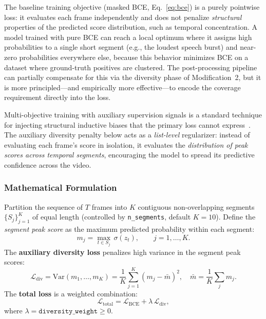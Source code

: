 \documentclass[10pt,conference]{IEEEtran}
\begin{document}
The baseline training objective (masked BCE, Eq.~\ref{eq:bce}) is a purely
pointwise loss: it evaluates each frame independently and does not penalize
\emph{structural} properties of the predicted score distribution, such as
temporal concentration. A model trained with pure BCE can reach a local
optimum where it assigns high probabilities to a single short segment (e.g.,
the loudest speech burst) and near-zero probabilities everywhere else, because
this behavior minimizes BCE on a dataset where ground-truth positives are
clustered. The post-processing pipeline can partially compensate for this via
the diversity phase of Modification~2, but it is more principled---and
empirically more effective---to encode the coverage requirement directly into
the loss.

Multi-objective training with auxiliary supervision signals is a standard
technique for injecting structural inductive biases that the primary loss
cannot express~\cite{caruana1997multitask}. The auxiliary diversity penalty
below acts as a \emph{list-level} regularizer: instead of evaluating each
frame's score in isolation, it evaluates the \emph{distribution of peak scores
across temporal segments}, encouraging the model to spread its predictive
confidence across the video.

\subsubsection{Mathematical Formulation}

Partition the sequence of $T$ frames into $K$ contiguous non-overlapping
segments $\{S_j\}_{j=1}^{K}$ of equal length (controlled by
\texttt{n\_segments}, default $K = 10$). Define the \emph{segment peak score}
as the maximum predicted probability within each segment:
\begin{equation}
  m_j = \max_{t \in S_j}\,\sigma(z_t), \qquad j = 1, \dots, K.
  \label{eq:peak}
\end{equation}
The \textbf{auxiliary diversity loss} penalizes high variance in the segment
peak scores:
\begin{equation}
  \mathcal{L}_{\mathrm{div}}
  = \mathrm{Var}(m_1, \dots, m_K)
  = \frac{1}{K}\sum_{j=1}^{K}(m_j - \bar{m})^2,
  \quad \bar{m} = \frac{1}{K}\sum_j m_j.
  \label{eq:ldiv}
\end{equation}
The \textbf{total loss} is a weighted combination:
\begin{equation}
  \mathcal{L}_{\mathrm{total}}
  = \mathcal{L}_{\mathrm{BCE}} + \lambda\,\mathcal{L}_{\mathrm{div}},
  \label{eq:total_loss}
\end{equation}
where $\lambda = \texttt{diversity\_weight} \ge 0$.
\end{document}
